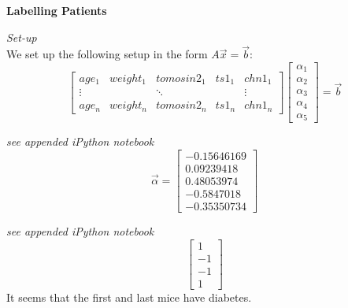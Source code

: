 \documentclass[letter]{article}
\newenvironment{menumerate}{\edef\backupindent{\the\parindent}
  \enumerate\setlength{\parindent}{\backupindent}}
  {\endenumerate}
\begin{document}
\begin{menumerate}
    \newpage
    \item \textbf{Labelling Patients}
    \begin{menumerate}
        \item \emph{Set-up}\\
        We set up the following setup in the form $A\vec{x} = \vec{b}$:
        \begin{equation*}
            \begin{bmatrix}
                age_1&weight_1&tomosin2_1&ts1_1&chn1_1\\
                \vdots&&\ddots&&\vdots\\
                age_n&weight_n&tomosin2_n&ts1_n&chn1_n
            \end{bmatrix}
            \begin{bmatrix}
                \alpha_1\\\alpha_2\\\alpha_3\\\alpha_4\\\alpha_5
            \end{bmatrix}
            = \vec{b}
        \end{equation*}
        \item \emph{see appended iPython notebook }\\
        \begin{equation*}
            \vec{\alpha} =
            \begin{bmatrix}
            -0.15646169\\
            0.09239418\\
            0.48053974\\
            -0.5847018\\
            -0.35350734
            \end{bmatrix}
        \end{equation*}
        \item \emph{see appended iPython notebook }\\
        \begin{equation*}
            \begin{bmatrix}
            1\\
            -1\\
            -1\\
            1
            \end{bmatrix}
        \end{equation*}
        It seems that the first and last mice have diabetes.
    \end{menumerate}


\end{menumerate}
\end{document}
